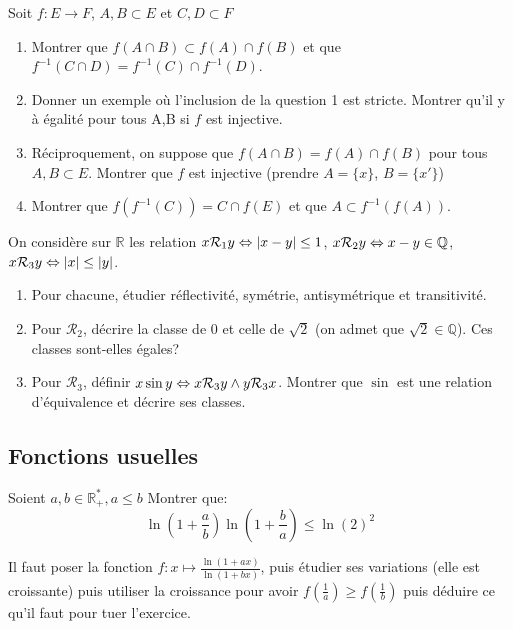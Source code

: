 \documentclass{article}
\newcommand{\R}{\mathbb{R}}
\newcommand{\abs}[1]{\lvert#1 \rvert}
\begin{document}
\begin{exercise}
  Soit $f:E\to F$, $A,B\subset E$ et $C,D \subset F$
  \begin{enumerate}
    \item Montrer que $f(A\cap B) \subset f(A)\cap f(B)$ et que $f^{-1}(C\cap D) = f^{-1}(C)\cap f^{-1}(D)$.
    \item Donner un exemple où l'inclusion de la question 1 est stricte. Montrer qu'il y à égalité pour tous A,B si $f$ est injective.
    \item Réciproquement, on suppose que $f(A\cap B) = f(A)\cap f(B)$ pour tous $A,B\subset E$. Montrer que $f$ est injective (prendre $A=\{x\}$, $B=\{x'\}$)
    \item Montrer que $f(f^{-1}(C)) = C\cap f(E)$ et que $A\subset f^{-1}(f(A))$.
  \end{enumerate}
\end{exercise}
\begin{exercise}
  On considère sur $\R$ les relation $x\mathcal{R}_1y \lfa \abs{x-y}\leq1$, $x\mathcal{R}_2y \Leftrightarrow x-y \in \mathbb{Q}$, $x\mathcal{R}_3y \lfa \abs{x}\leq\abs{y}$.
  \begin{enumerate}

    \item Pour chacune, étudier réflectivité, symétrie, antisymétrique et transitivité.
    \item Pour $\mathcal{R}_2$, décrire la classe de $0$ et celle de $\sqrt{2}$ (on admet que $\sqrt{2} \in \mathbb{Q}$). Ces classes sont-elles égales?
    \item Pour $\mathcal{R}_3$, définir $x \sin y \Leftrightarrow x\mathcal{R}_3y \land y \mathcal{R}_3 x$. Montrer que $\sin$ est une relation d'équivalence et décrire ses classes.
  \end{enumerate}

\end{exercise}

\subsection{Fonctions usuelles}

\begin{exercise}
  Soient $a, b \in \R^*_+, a\leq b$
  Montrer que:
  \[\ln \left( 1 + \frac{a}{b}\right)\ln\left(1+\frac{b}{a}\right) \leq \ln {(2)}^2\]

\end{exercise}
\begin{solution}
  Il faut poser la fonction $f:x\mapsto \frac{\ln(1+ax)}{\ln(1+bx)}$, puis étudier ses variations (elle est croissante) puis utiliser la croissance pour avoir $f\left(\frac 1 a\right)\geq f\left(\frac 1 b\right)$ puis déduire ce qu'il faut pour tuer l'exercice.

\end{solution}
\end{document}
